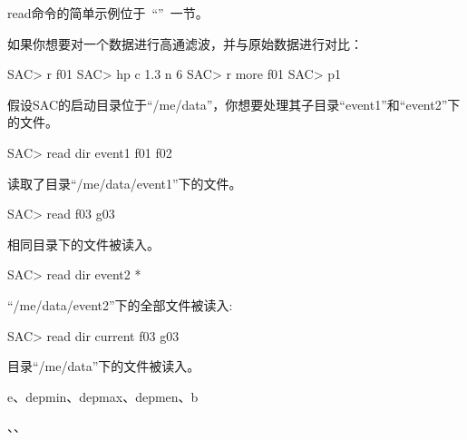 read命令的简单示例位于~``''~一节。

如果你想要对一个数据进行高通滤波，并与原始数据进行对比：
\begin{SACCode}
SAC> r f01
SAC> hp c 1.3 n 6
SAC> r more f01
SAC> p1
\end{SACCode}

假设SAC的启动目录位于``/me/data''，你想要处理其子目录``event1''和``event2''下的文件。
\begin{SACCode}
SAC> read dir event1 f01 f02
\end{SACCode}
读取了目录``/me/data/event1''下的文件。

\begin{SACCode}
SAC> read f03 g03
\end{SACCode}
相同目录下的文件被读入。

\begin{SACCode}
SAC> read dir event2 *
\end{SACCode}
``/me/data/event2''下的全部文件被读入:

\begin{SACCode}
SAC> read dir current f03 g03
\end{SACCode}
目录``/me/data''下的文件被读入。

e、depmin、depmax、depmen、b

、、
